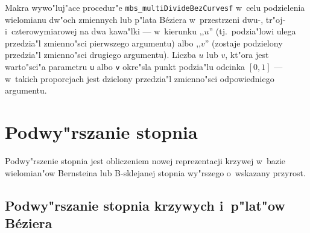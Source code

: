 \vspace{\bigskipamount}
Makra wywo"luj"ace procedur"e \texttt{mbs\_multiDivideBezCurvesf} w~celu
podzielenia wielomianu dw"och zmiennych lub p"lata B\'{e}ziera w~przestrzeni
dwu-, tr"oj-
i~czterowymiarowej na dwa kawa"lki --- w~kierunku ,,$u$'' (tj.\ podzia"lowi
ulega przedzia"l zmienno"sci pierwszego argumentu) albo ,,$v$'' (zostaje
podzielony przedzia"l zmienno"sci drugiego argumentu). Liczba $u$ lub $v$,
kt"ora jest warto"sci"a parametru \texttt{u} albo \texttt{v} okre"sla punkt
podzia"lu odcinka $[0,1]$ --- w~takich proporcjach jest dzielony przedzia"l
zmienno"sci odpowiedniego argumentu.


\newpage
\section{Podwy"rszanie stopnia}

Podwy"rszenie stopnia jest obliczeniem nowej reprezentacji krzywej w~bazie
wielomian"ow Bernsteina lub B-sklejanej stopnia wy"rszego o~wskazany
przyrost.

\subsection{Podwy"rszanie stopnia krzywych i~p"lat"ow B\'{e}ziera}

